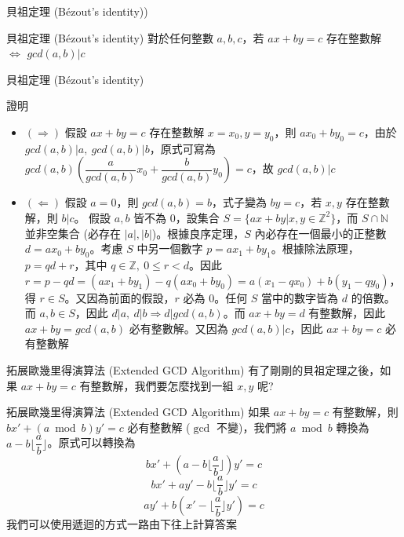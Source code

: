 \documentclass[aspectratio=169]{beamer}
\begin{document}
\begin{frame}{貝祖定理 (Bézout's identity))}
    \begin{alertblock}{貝祖定理 (Bézout's identity)}
        對於任何整數 $a,b,c$，若 $ax+by = c$ 存在整數解 $\iff$ $gcd(a,b) | c$
    \end{alertblock} 
\end{frame}

\begin{frame}{貝祖定理 (Bézout's identity)}
    \begin{block}{證明}
        \begin{itemize}
            \item $(\Rightarrow)$ 
            假設 $ax+by=c$ 存在整數解 $x=x_0, y=y_0$，則 $ax_0+by_0=c$，由於 $gcd(a,b) | a, \ gcd(a,b) | b$，原式可寫為 $gcd(a,b) (\dfrac{a}{gcd(a,b)}x_0 + \dfrac{b}{gcd(a,b)}y_0) = c$，故 $gcd(a,b) | c$
            \item $(\Leftarrow)$ 假設 $a=0$，則 $gcd(a,b)=b$，式子變為 $by = c$，若 $x,y$ 存在整數解，則 $b|c$。 
            \newline
            假設 $a,b$ 皆不為 $0$，設集合 $S = \{ax+by|x,y \in \mathbb{Z}^2\}$，而 $S \cap \mathbb{N}$ 並非空集合 (必存在 $|a|, |b|$)。根據良序定理，$S$ 內必存在一個最小的正整數 $d = ax_0+by_0$。考慮 $S$ 中另一個數字 $p=ax_1+by_1$。根據除法原理，$p = qd + r$，其中 $q \in \mathbb{Z}, \ 0 \le r < d$。因此 $r = p-qd = (ax_1+by_1)-q(ax_0+by_0) = a(x_1-qx_0)+b(y_1-qy_0)$，得 $r \in S$。又因為前面的假設，$r$ 必為 $0$。任何 $S$ 當中的數字皆為 $d$ 的倍數。而 $a,b \in S$，因此 $d|a, \ d|b \Rightarrow d|gcd(a,b)$。而 $ax+by=d$ 有整數解，因此 $ax+by=gcd(a,b)$ 必有整數解。又因為 $gcd(a,b)|c$，因此 $ax+by=c$ 必有整數解
        \end{itemize}
    \end{block}
\end{frame}

\begin{frame}{拓展歐幾里得演算法 (Extended GCD Algorithm)}
    有了剛剛的貝祖定理之後，如果 $ax+by=c$ 有整數解，我們要怎麼找到一組 $x,y$ 呢?
    \begin{alertblock}{拓展歐幾里得演算法 (Extended GCD Algorithm)}
        如果 $ax+by=c$ 有整數解，則 $bx'+(a \bmod b)y' = c$ 必有整數解 ($\gcd$ 不變)，我們將 $a \bmod b$ 轉換為 $a - b \Big \lfloor \dfrac{a}{b} \Big \rfloor$。原式可以轉換為 
        $$bx' + (a - b \Big \lfloor \dfrac{a}{b} \Big \rfloor)y' = c$$
        $$bx' + ay' - b \Big \lfloor \dfrac{a}{b} \Big \rfloor y' = c$$
        $$ay' + b (x' - \Big \lfloor \dfrac{a}{b} \Big \rfloor y') = c$$
        我們可以使用遞迴的方式一路由下往上計算答案
    \end{alertblock} 
\end{frame}
\end{document}
